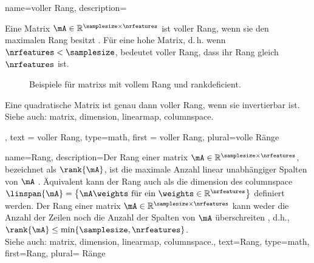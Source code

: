 {
  name={voller Rang},
  description={Eine \gls{Matrix} $\mA \in \mathbb{R}^{\samplesize \times \nrfeatures}$ 
  ist  voller Rang, wenn sie den maximalen \gls{Rang} besitzt \cite{StrangLinAlg2016}. 
  Für eine hohe \gls{Matrix}, d.\,h. wenn $\nrfeatures < \samplesize$, bedeutet voller Rang, dass ihr \gls{Rang} gleich $\nrfeatures$ ist. 
 \begin{figure}[H]
\centering
{}
\caption{Beispiele für \glspl{matrix} mit vollem Rang und \gls{rankdeficient}.}
\end{figure} 
  Eine quadratische Matrix ist genau dann voller Rang, wenn sie invertierbar ist.\\
  Siehe auch: \gls{matrix}, \gls{dimension}, \gls{linearmap}, \gls{columnspace}.}, 
  text = {voller Rang}, 
  type=math,
  first = {voller Rang},
  plural={volle Ränge}
}

{
  name={Rang},
  description={Der Rang einer \gls{matrix} $\mA \in \mathbb{R}^{\samplesize \times \nrfeatures}$, 
  bezeichnet als $\rank{\mA}$, ist die maximale Anzahl linear unabhängiger Spalten von $\mA$ \cite{StrangLinAlg2016}. 
  Äquivalent kann der Rang auch als die \gls{dimension} des \gls{columnspace} 
  $\linspan{\mA} = \big\{ \mA \weights \mbox{ für ein } \weights \in \mathbb{R}^{\nrfeatures} \big\}$ definiert werden. 
  Der Rang einer \gls{matrix} $\mA \in \mathbb{R}^{\samplesize \times \nrfeatures}$ 
  kann weder die Anzahl der Zeilen noch die Anzahl der Spalten von $\mA$ überschreiten \cite{Horn91,MeyerMatrixAnalysis}, 
  d.h., $\rank{\mA} \leq \min \{ \samplesize, \nrfeatures \}$. \\
  Siehe auch: \gls{matrix}, \gls{dimension}, \gls{linearmap}, \gls{columnspace}.},
  text={Rang},
  type=math,
  first={Rang},
  plural= {Ränge}
}



